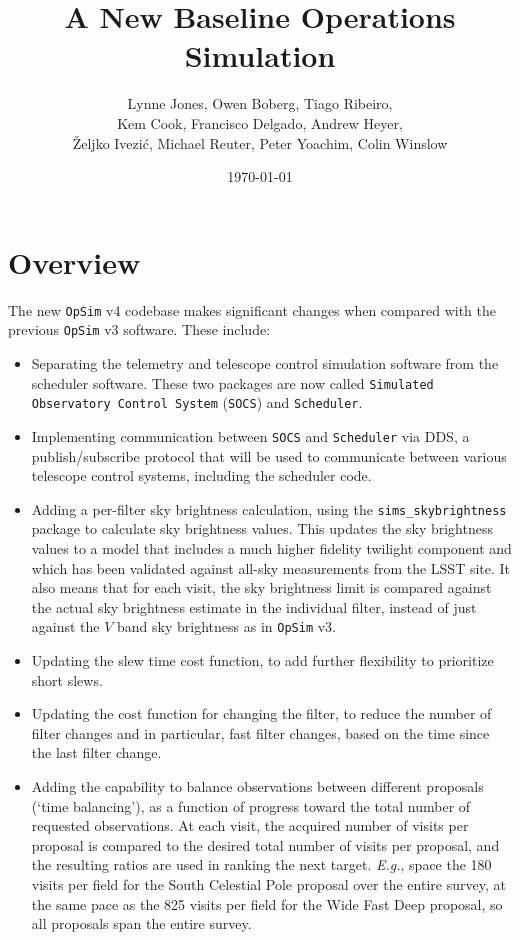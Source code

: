 \documentclass[DM,lsstdraft,authoryear,toc]{lsstdoc}
\title{A New Baseline Operations Simulation}
\author{%
Lynne Jones,
Owen Boberg,
Tiago Ribeiro, \\
Kem Cook,
Francisco Delgado,
Andrew Heyer, \\
\v{Z}eljko Ivezi\'{c},
Michael Reuter,
Peter Yoachim,
Colin Winslow
}
\date{\today}
\newcommand{\opsim}{\texttt{OpSim}\xspace}
\newcommand{\socs}{\texttt{SOCS}\xspace}
\newcommand{\sched}{\texttt{Scheduler}\xspace}
\newcommand{\simsky}{\texttt{sims\_skybrightness}\xspace}
\begin{document}
\maketitle

\section{Overview}

The new \opsim v4 codebase makes significant changes when compared with the previous \opsim v3 software. These include:
\begin{itemize}
\item Separating the telemetry and telescope control simulation software from the scheduler software. These two packages are now called \texttt{Simulated Observatory Control System} (\socs) and \texttt{Scheduler}.
\item Implementing communication between \socs and \sched via DDS, a publish/subscribe protocol that will be used to communicate between various telescope control systems, including the scheduler code.
\item Adding a per-filter sky brightness calculation, using the \simsky package to calculate sky brightness values. This updates the sky brightness values to a model that includes a much higher fidelity twilight component and which has been validated against all-sky measurements from the LSST site. It also means that for each visit, the sky brightness limit is compared against the actual sky brightness estimate in the individual filter, instead of just against the $V$ band sky brightness as in \opsim v3.
\item Updating the slew time cost function, to add further flexibility to prioritize short slews.
\item Updating the cost function for changing the filter, to reduce the number of filter changes and in particular, fast filter changes, based on the time since the last filter change.
\item Adding the capability to balance observations between different proposals (`time balancing'), as a function of progress toward the total number of requested observations. At each visit, the acquired number of visits per proposal is compared to the desired total number of visits per proposal, and the resulting ratios are used in ranking the next target.  {\it E.g.}, space the 180 visits per field for the South Celestial Pole proposal over the entire survey, at the same pace as the 825 visits per field for the Wide Fast Deep proposal, so all proposals span the entire survey.

\end{itemize}
\end{document}

